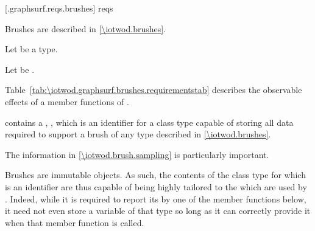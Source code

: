  [\iotwod.graphsurf.reqs.brushes]{ reqs}

\pnum
Brushes are described in \ref{\iotwod.brushes}.

\pnum
Let  be a \graphicssurfacestemplparam type.

\pnum
Let  be .

\pnum
Table~\ref{tab:\iotwod.graphsurf.brushes.requirementstab} describes the observable effects of a member functions of .

\pnum
{} contains a , 
, which is an identifier for a class type capable of
storing all data required to support a brush of any type described in
\ref{\iotwod.brushes}. \begin{note}
The information in \ref{\iotwod.brush.sampling} is particularly important.
\end{note}

\pnum
\begin{note}
Brushes are immutable objects. As such, the contents of the class type for which  is an identifier are thus capable of being highly tailored to the \underlyingrendandpresenttechs which are used by . Indeed, while it is required to report its  by one of the member functions below, it need not even store a variable of that type so long as it can correctly provide it when that member function is called.
\end{note}

